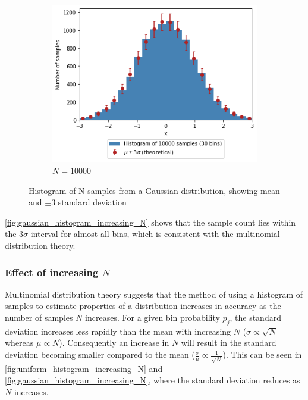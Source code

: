 \documentclass[a4paper]{article}
\begin{document}
\begin{figure}[h]
    \hfill
    \begin{subfigure}[b]{0.3\textwidth}
        \centering
        \includegraphics[width=\textwidth]{figures/gaussian_histogram_10000.png}
        \caption{$N=10000$}
        \label{fig:gaussian_histogram_10000}
    \end{subfigure}
    \caption{Histogram of N samples from a Gaussian distribution, showing mean and $\pm3$ standard deviation}
    \label{fig:gaussian_histogram_increasing_N}
\end{figure}

\autoref{fig:gaussian_histogram_increasing_N} shows that the sample count lies within the $3\sigma$ interval for almost
all bins, which is consistent with the multinomial distribution theory.


\subsubsection{Effect of increasing $N$}
Multinomial distribution theory suggests that the method of using a histogram of samples to estimate properties of a
distribution increases in accuracy as the number of samples $N$ increases.
For a given bin probability $p_j$, the standard deviation increases less rapidly than the mean with increasing $N$
($\sigma \propto \sqrt{N}$ whereas $\mu \propto N$).
Consequently an increase in $N$ will result in the standard deviation becoming smaller compared to the mean
($\frac{\sigma}{\mu} \propto \frac{1}{\sqrt{N}}$).
This can be seen in \autoref{fig:uniform_histogram_increasing_N} and \autoref{fig:gaussian_histogram_increasing_N},
where the standard deviation reduces as $N$ increases.
\end{document}

